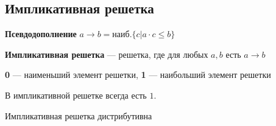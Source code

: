 \documentclass[english]{article}
\begin{document}
\subsection{Импликативная решетка}
\label{sec:orgb430b6a}
\begin{definition}
	\textbf{Псевдодополнение} \(a \to b = \text{наиб.}\{c \big| a \cdot c \le b\}\)
	\label{orge9b8efb}
\end{definition}
\begin{definition}
	\textbf{Импликативная решетка} --- решетка, где для любых \(a, b\) есть \(a \to b\)
	\label{orga61a1cc}
\end{definition}
\begin{definition}
	\textbf{0} --- наименьший элемент решетки, \textbf{1} --- наибольший элемент решетки
	\label{org93d0311}
\end{definition}
\begin{lemma}
	В импликативной решетке всегда есть \(1\).
	\label{org0de4829}
\end{lemma}
\begin{lemma}
	Импликативная решетка дистрибутивна
\end{lemma}
\end{document}
